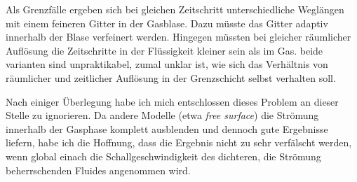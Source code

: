 \documentclass[a4paper,10pt]{scrreprt}
\begin{document}
Als Grenzfälle ergeben sich bei gleichen Zeitschritt unterschiedliche Weglängen mit einem feineren Gitter in der Gasblase. 
Dazu müsste das Gitter adaptiv innerhalb der Blase verfeinert werden. 
Hingegen müssten bei gleicher räumlicher Auflösung die Zeitschritte in der Flüssigkeit kleiner sein als im Gas. 
beide varianten sind unpraktikabel, zumal unklar ist, wie sich das Verhältnis von räumlicher und zeitlicher Auflösung in der Grenzschicht selbst verhalten soll.

Nach einiger Überlegung habe ich mich entschlossen dieses Problem an dieser Stelle zu ignorieren. 
Da andere Modelle (etwa \emph{free surface}) die Strömung innerhalb der Gasphase komplett ausblenden und dennoch gute Ergebnisse liefern, habe ich die Hoffnung, dass die Ergebnis nicht zu sehr verfälscht werden, wenn global einach die Schallgeschwindigkeit des dichteren, die Strömung beherrschenden Fluides angenommen wird.
\end{document}
